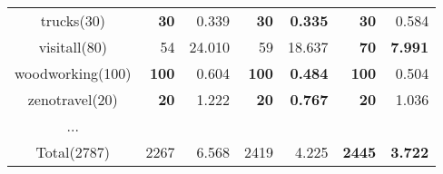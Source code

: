 \begin{center}
\begin{tabular}{c rr rr rr}
    trucks(30)      & \textbf{30}   & 0.339             & \textbf{30}   & \textbf{0.335}      & \textbf{30}     & 0.584  \\
    visitall(80)    & 54            & 24.010            & 59            & 18.637              & \textbf{70}     & \textbf{7.991} \\
    woodworking(100)& \textbf{100}  & 0.604             & \textbf{100}  & \textbf{0.484}      & \textbf{100}    & 0.504 \\
    zenotravel(20)  & \textbf{20}   & 1.222             & \textbf{20}   & \textbf{0.767}      & \textbf{20}     & 1.036 \\
    ...\\
    \midrule
    Total(2787) & 2267 & 6.568 & 2419 & 4.225 & \textbf{2445} & \textbf{3.722} \\
    \bottomrule
 \end{tabular}
\end{center}